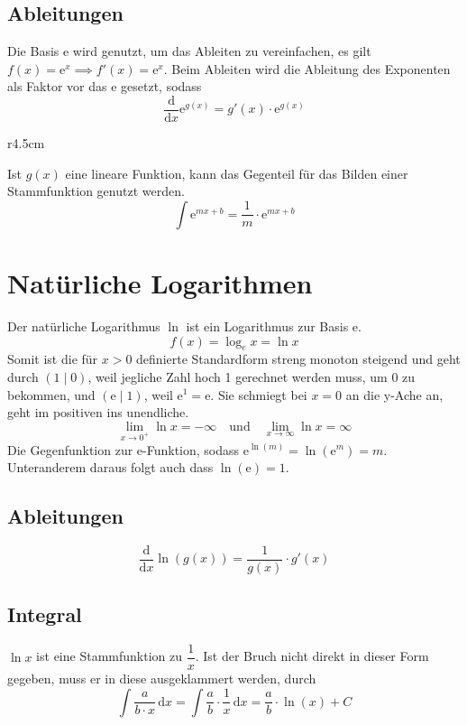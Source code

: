 \documentclass{article}
\begin{document}
\subsection{Ableitungen} 
Die Basis $\mathrm{e}$ wird genutzt, um das Ableiten zu vereinfachen, es gilt $f(x)=\mathrm{e}^x \implies f'(x)=\mathrm{e}^x$. \newline
Beim Ableiten wird die Ableitung des Exponenten als Faktor vor das $\mathrm{e}$ gesetzt, sodass 
\[
 \frac{\mathrm{d}}{\mathrm{d}x} \mathrm{e}^{g(x)} = g'(x) \cdot \mathrm{e}^{g(x)} 
\]  
\begin{wrapfigure}{r}{4.5cm}
 \centering
\end{wrapfigure} 
Ist $g(x)$ eine lineare Funktion, kann das Gegenteil für das Bilden einer Stammfunktion genutzt werden. 
\[
 \int \mathrm{e}^{mx+b} = \frac{1}{m} \cdot \mathrm{e}^{mx+b}
\] 
\section{Natürliche Logarithmen}  
Der natürliche Logarithmus $\ln$ ist ein Logarithmus zur Basis $\mathrm{e}$.
\[
 f(x) = \log_e{x} = \ln{x}
\] 
Somit ist die für $x>0$ definierte Standardform streng monoton steigend und geht durch ${(1 \mid 0)}$, weil jegliche Zahl hoch 1 gerechnet werden muss, um 0 zu bekommen, und $(\mathrm{e} \mid 1)$, weil $\mathrm{e}^1=\mathrm{e}$. \newline
Sie schmiegt bei $x=0$ an die y-Ache an, geht im positiven ins unendliche.
\[
 \lim_{x \to 0^+} \ln x = -\infty
 \quad \text{und} \quad
 \lim_{x \to \infty} \ln x= \infty
\] 
Die Gegenfunktion zur e-Funktion, sodass $\mathrm{e}^{\ln(m)}=\ln{(\mathrm{e}^m)}=m$. Unteranderem daraus folgt auch dass $\ln(\mathrm{e})=1$.
\subsection{Ableitungen} 
\[
 \frac{\mathrm{d}}{\mathrm{d}x} \ln{(g(x))} = \frac{1}{g(x)} \cdot g'(x) 
\] 
\subsection{Integral}
$\ln{x}$ ist eine Stammfunktion zu $\dfrac{1}{x}$. Ist der Bruch nicht direkt in dieser Form gegeben, muss er in diese ausgeklammert werden, durch
\[
 \int \frac{a}{b \cdot x} \,\mathrm{d}x =
 \int \frac{a}{b} \cdot \frac{1}{x} \,\mathrm{d}x =
 \frac{a}{b} \cdot \ln(x) + C
\] 
 
\end{document}
